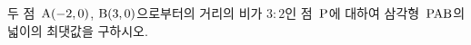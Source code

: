 두 점~$\mathrm{A}(-2{,}\mkern3mu\mathopen{}0)$, $\mathrm{B}(3{,}\mkern3mu\mathopen{}0)$으로부터의 거리의 비가 $3:2$인 점~$\mathrm{P}$에 대하여 삼각형~$\mathrm{PAB}$의 넓이의 최댓값을 구하시오.
